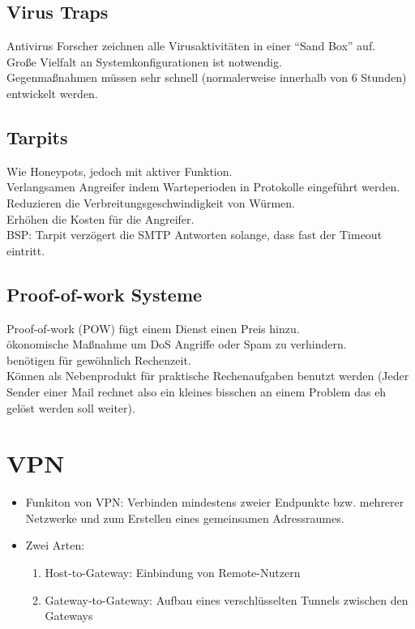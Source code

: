 \documentclass{article} %
\begin{document}
\subsection{Virus Traps}
Antivirus Forscher zeichnen alle Virusaktivitäten in einer "`Sand Box"' auf.\\
Große Vielfalt an Systemkonfigurationen ist notwendig.\\
Gegenmaßnahmen müssen sehr schnell (normalerweise innerhalb von 6 Stunden) entwickelt werden.
\subsection{Tarpits}
Wie Honeypots, jedoch mit aktiver Funktion.\\
Verlangsamen Angreifer indem Warteperioden in Protokolle eingeführt werden.\\
Reduzieren die Verbreitungsgeschwindigkeit von Würmen.\\
Erhöhen die Kosten für die Angreifer.\\
BSP: Tarpit verzögert die SMTP Antworten solange, dass fast der Timeout eintritt.
\subsection{Proof-of-work Systeme}
Proof-of-work (POW) fügt einem Dienst einen Preis hinzu.\\
ökonomische Maßnahme um DoS Angriffe oder Spam zu verhindern.\\
benötigen für gewöhnlich Rechenzeit.\\
Können als Nebenprodukt für praktische Rechenaufgaben benutzt werden (Jeder Sender einer Mail rechnet also ein kleines bisschen an einem Problem das eh gelöst werden soll weiter). 
\section{VPN}
	\begin{itemize}
		\item Funkiton von VPN: Verbinden mindestens zweier Endpunkte bzw. mehrerer Netzwerke und zum Erstellen eines gemeinsamen Adressraumes.
		\item Zwei Arten:
			\begin{enumerate}
			\item Host-to-Gateway: Einbindung von Remote-Nutzern
			\item Gateway-to-Gateway: Aufbau eines verschlüsselten Tunnels zwischen den Gateways
			\end{enumerate}
		\end{itemize}
\end{document}

